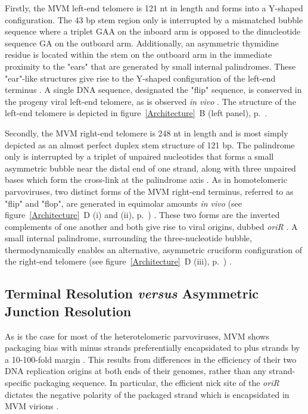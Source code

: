 Firstly, the MVM left-end telomere is 121 nt in length and forms into a Y-shaped configuration. The 43 bp stem region only is interrupted by a mismatched bubble sequence where a triplet GAA on the inboard arm is opposed to the dinucleotide sequence GA on the outboard arm. Additionally, an asymmetric thymidine residue is located within the stem on the outboard arm in the immediate proximity to the "ears" that are generated by small internal palindromes. These "ear"-like structures give rise to the Y-shaped configuration of the left-end terminus \cite{pmid225040, pmid6298737, pmid3973977, replication}. A single DNA sequence, designated the "flip" sequence, is conserved in the progeny viral left-end telomere, as is observed \textit{in vivo} \cite{pmid3973977}. The structure of the left-end telomere is depicted in figure~\ref{Architecture}~B (left panel), p.~\pageref{Architecture}. 

Secondly, the MVM right-end telomere is 248 nt in length and is most simply depicted as an almost perfect duplex stem structure of 121 bp. The palindrome only is interrupted by a triplet of unpaired nucleotides that forms a small asymmetric bubble near the distal end of one strand, along with three unpaired bases which form the cross-link at the palindrome axis \cite{pmid6298737, pmid3973977}. As in homotelomeric parvoviruses, two distinct forms of the MVM right-end terminus, referred to as "flip" and "flop", are generated in equimolar amounts \textit{in vivo} (see figure~\ref{Architecture}~D (i) and (ii), p.~\pageref{Architecture}) \cite{telomere2, encapsidation}. These two forms are the inverted complements of one another and both give rise to viral origins, dubbed \textit{oriR} \cite{pmid1388310, pmid9765384, pmid10627544}. A small internal palindrome, surrounding the three-nucleotide bubble, thermodynamically enables an alternative, asymmetric cruciform configuration of the right-end telomere (see figure~\ref{Architecture}~D (iii), p.~\pageref{Architecture}) \cite{pmid6602687}. 


\subsection{Terminal Resolution \textit{versus} Asymmetric Junction Resolution}
\label{Resolution}

As is the case for most of the heterotelomeric parvoviruses, MVM shows packaging bias with minus strands preferentially encapsidated to plus strands by a 10-100-fold margin \cite{pmid6828378, pmid3296697}. This results from differences in the efficiency of their two DNA replication origins at both ends of their genomes, rather than any strand-specific packaging sequence. In particular, the efficient nick site of the \textit{oriR} dictates the negative polarity of the packaged strand which is encapsidated in MVM virions \cite{pmid15681430}. 

